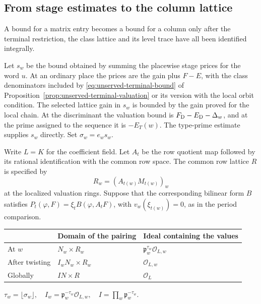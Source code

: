 







\subsection{From stage estimates to the column lattice}
\label{subsec:division-shift}

A bound for a matrix entry becomes a bound for a column only after the terminal restriction, the class lattice and its level trace have all been identified integrally.




Let \(s_w\) be the bound obtained by summing the
placewise stage prices for the word \(u\). At an
ordinary place the prices are the gain plus \(F-E\),
with the class denominators included by
\eqref{eq:unserved-terminal-bound} of Proposition~\ref{prop:unserved-terminal-valuation}
or its version with the local orbit condition.
The selected lattice gain in \(s_w\) is bounded by the
gain proved for the local chain. At the discriminant the valuation bound is \(F_{\rm D}-E_{\rm D}-\Delta_w\), and at the
prime assigned to the sequence it is \(-E_T(w)\). The type-prime estimate
supplies \(s_w\) directly. Set \(\sigma_w=e_ws_w\).

Write \(L=K\) for the coefficient field. Let \(A_t\) be the row
quotient map followed by its rational identification with the
common row space. The common row lattice \(R\) is specified
by
\[
       R_w=(A_{t(w)}M_{t(w)})_w
\]
at the localized valuation rings. Suppose that the corresponding
bilinear form \(B\) satisfies \(P_t(\varphi,F)
=\xi_t B(\varphi,A_tF)\), with \(v_w(\xi_{t(w)})=0\), as in
the period comparison.

\begin{construction}
\begin{tabular}{@{}lll@{}}\toprule
 & Domain of the pairing & Ideal containing the values \\ \midrule
At \(w\) & \(N_w\times R_w\) & \(\mathfrak p_w^{\tau_w}\mathcal O_{L,w}\) \\
After twisting & \(I_wN_w\times R_w\) & \(\mathcal O_{L,w}\) \\
Globally & \(IN\times R\) & \(\mathcal O_L\) \\ \bottomrule
\end{tabular}
\par\smallskip
\(\tau_w=\lfloor\sigma_w\rfloor,\quad
 I_w=\mathfrak p_w^{-\tau_w}\mathcal O_{L,w},\quad
 I=\prod_w\mathfrak p_w^{-\tau_w}.\)
\caption{From the local period valuations to the integral Hermitian dual in Proposition~\ref{prop:finite-period-shift}.}\label{fig:analytic-shift}
\end{construction}

